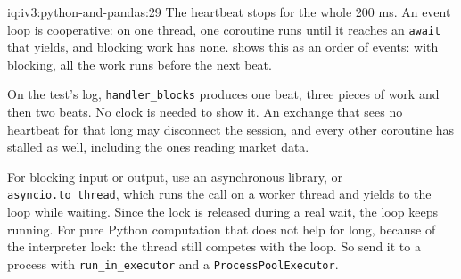 \begin{solution}{iq:iv3:python-and-pandas:29}
The heartbeat stops for the whole 200 ms. An event loop is cooperative: on one thread, one coroutine runs until it reaches an \texttt{await} that yields, and blocking work has none.  shows this as an order of events: with blocking, all the work runs before the next beat.
\label{lst:iv3:pp:async}

On the test's log, \texttt{handler\_blocks} produces one beat, three pieces of work and then two beats. No clock is needed to show it. An exchange that sees no heartbeat for that long may disconnect the session, and every other coroutine has stalled as well, including the ones reading market data.

For blocking input or output, use an asynchronous library, or \texttt{asyncio.to\_thread}, which runs the call on a worker thread and yields to the loop while waiting. Since the lock is released during a real wait, the loop keeps running. For pure Python computation that does not help for long, because of the interpreter lock: the thread still competes with the loop. So send it to a process with \texttt{run\_in\_executor} and a \texttt{ProcessPoolExecutor}.

\end{solution}

